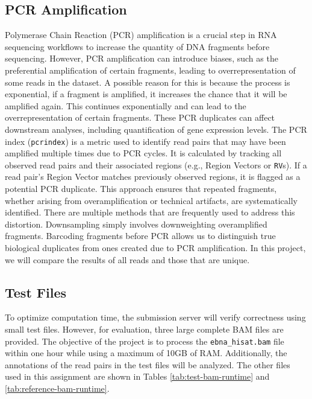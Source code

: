 \documentclass{article}
\begin{document}
    \subsection{PCR Amplification}
    Polymerase Chain Reaction (PCR) amplification is a crucial step in RNA sequencing workflows to increase the quantity of DNA fragments before sequencing. However, PCR amplification can introduce biases, such as the preferential amplification of certain fragments, leading to overrepresentation of some reads in the dataset. A possible reason for this is because the process is exponential, if a fragment is amplified, it increases the chance that it will be amplified again. This continues exponentially and can lead to the overrepresentation of certain fragments. These PCR duplicates can affect downstream analyses, including quantification of gene expression levels. The PCR index (\texttt{pcrindex}) is a metric used to identify read pairs that may have been amplified multiple times due to PCR cycles. It is calculated by tracking all observed read pairs and their associated regions (e.g., Region Vectors or \texttt{RV}s). If a read pair’s Region Vector matches previously observed regions, it is flagged as a potential PCR duplicate. This approach ensures that repeated fragments, whether arising from overamplification or technical artifacts, are systematically identified.
    There are multiple methods that are frequently used to address this distortion. Downsampling simply involves downweighting overamplified fragments. Barcoding fragments before PCR allows us to distinguish true biological duplicates from ones created due to PCR amplification. In this project, we will compare the results of all reads and those that are unique.

    \subsection{Test Files}
    To optimize computation time, the submission server will verify correctness using small test files. However, for evaluation, three large complete BAM files are provided. The objective of the project is to process the \texttt{ebna\_hisat.bam} file within one hour while using a maximum of 10GB of RAM. Additionally, the annotations of the read pairs in the test files will be analyzed. The other files used in this assignment are shown in Tables \ref{tab:test-bam-runtime} and \ref{tab:reference-bam-runtime}.
\end{document}
